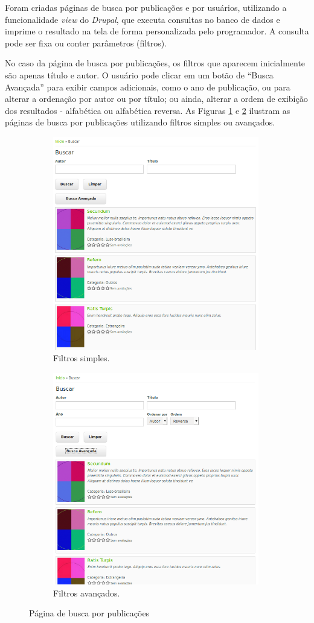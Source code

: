 \documentclass[a4paper]{article}
\begin{document}
Foram criadas páginas de busca por publicações e por usuários, utilizando a funcionalidade \textit{view} do \textit{Drupal}, que executa consultas no banco de dados e imprime o resultado na tela de forma personalizada pelo programador. A consulta pode ser fixa ou conter parâmetros (filtros). 

No caso da página de busca por publicações, os filtros que aparecem inicialmente são apenas título e autor. O usuário pode clicar em um botão de “Busca Avançada” para exibir campos adicionais, como o ano de publicação, ou para alterar a ordenação por autor ou por título; ou ainda, alterar a ordem de exibição dos resultados - alfabética ou alfabética reversa. As Figuras \ref{simple} e \ref{advanced} ilustram as páginas de busca por publicações utilizando filtros simples ou avançados.

\begin{figure}
\begin{subfigure}{.5\textwidth}
  \includegraphics[width=90mm]{img/browse-simple.png}
  \caption{Filtros simples.}
  \label{simple}
\end{subfigure}%
\begin{subfigure}{.5\textwidth}
  \includegraphics[width=90mm]{img/browse-advanced.png}
  \caption{Filtros avançados.}
  \label{advanced}
\end{subfigure}
\caption{Página de busca por publicações}
\label{fig:publication-search}
\end{figure}
\end{document}
